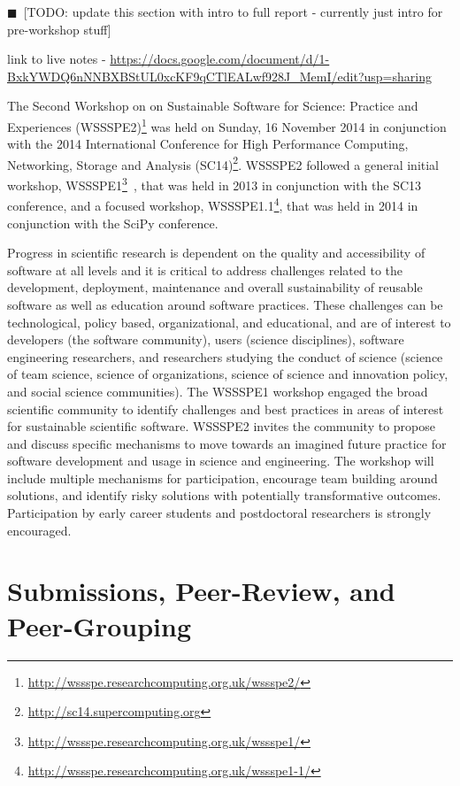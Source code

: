 \documentclass[11pt, oneside]{amsart}
\newcommand{\todo}[1]{{\color{blue}$\blacksquare$~\textsf{[TODO: #1]}}}
\begin{document}
\todo{update this section with intro to full report - currently just intro for pre-workshop stuff}

link to live notes - \url{https://docs.google.com/document/d/1-BxkYWDQ6nNNBXBStUL0xcKF9qCTlEALwf928J_MemI/edit?usp=sharing}

The Second Workshop on on Sustainable Software for Science: Practice and Experiences (WSSSPE2)\footnote{\url{http://wssspe.researchcomputing.org.uk/wssspe2/}} was held on Sunday, 16 November 2014 in conjunction with the 2014 International Conference for High Performance Computing, Networking, Storage and Analysis (SC14)\footnote{\url{http://sc14.supercomputing.org}}.
WSSSPE2 followed a general initial workshop, WSSSPE1\footnote{\url{http://wssspe.researchcomputing.org.uk/wssspe1/}}~\cite{WSSSPE1-pre-report,WSSSPE1}, that was held in 2013 in conjunction with the SC13 conference, and a focused workshop, WSSSPE1.1\footnote{\url{http://wssspe.researchcomputing.org.uk/wssspe1-1/}}, that was held in 2014 in conjunction with the SciPy conference.

Progress in scientific research is dependent on the quality and accessibility of software at all levels and it is critical to address challenges related to the development, deployment, maintenance and overall sustainability of reusable software as well as education around software practices. These challenges can be technological, policy based, organizational, and educational, and are of interest to developers (the software community), users (science disciplines), software engineering researchers, and researchers studying the conduct of science (science of team science, science of organizations, science of science and innovation policy, and social science communities). The WSSSPE1 workshop engaged the broad scientific community to identify challenges and best practices in areas of interest for sustainable scientific software. WSSSPE2 invites the community to propose and discuss specific mechanisms to move towards an imagined future practice for software development and usage in science and engineering. The workshop will include multiple mechanisms for participation, encourage team building around solutions, and identify risky solutions with potentially transformative outcomes. Participation by early career students and postdoctoral researchers is strongly encouraged.



\section{Submissions, Peer-Review, and Peer-Grouping}
\end{document}
